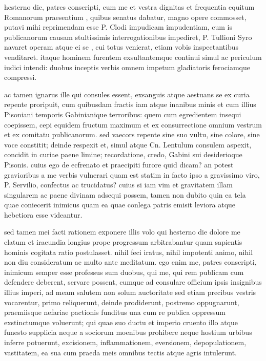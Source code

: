 
 hesterno die, patres conscripti, cum me et vestra dignitas et frequentia equitum Romanorum praesentium , quibus senatus dabatur, magno opere commosset, putavi mihi reprimendam esse P. Clodi impudicam impudentiam, cum is publicanorum causam stultissimis interrogationibus impediret, P. Tullioni Syro navaret operam atque ei se , cui totus venierat, etiam vobis inspectantibus venditaret. itaque hominem furentem exsultantemque continui simul ac periculum iudici intendi: duobus inceptis verbis omnem impetum gladiatoris ferociamque compressi.

 ac tamen ignarus ille qui consules essent, exsanguis atque aestuans se ex curia repente proripuit, cum quibusdam fractis iam atque inanibus minis et cum illius Pisoniani temporis Gabinianique terroribus: quem cum egredientem insequi coepissem, cepi equidem fructum maximum et ex consurrectione omnium vestrum et ex comitatu publicanorum. sed vaecors repente sine suo vultu, sine colore, sine voce constitit; deinde respexit et, simul atque Cn. Lentulum consulem aspexit, concidit in curiae paene limine; recordatione, credo, Gabini sui desiderioque Pisonis. cuius ego de ecfrenato et praecipiti furore quid dicam? an potest gravioribus a me verbis vulnerari quam est statim in facto ipso a gravissimo viro, P. Servilio, confectus ac trucidatus? cuius si iam vim et gravitatem illam singularem ac paene divinam adsequi possem, tamen non dubito quin ea tela quae coniecerit inimicus quam ea quae conlega patris emisit leviora atque hebetiora esse videantur.

 sed tamen mei facti rationem exponere illis volo qui hesterno die dolore me elatum et iracundia longius prope progressum arbitrabantur quam sapientis hominis cogitata ratio postulasset. nihil feci iratus, nihil impotenti animo, nihil non diu consideratum ac multo ante meditatum. ego enim me, patres conscripti, inimicum semper esse professus sum duobus, qui me, qui rem publicam cum defendere deberent, servare possent, cumque ad consulare officium ipsis insignibus illius imperi, ad meam salutem non solum auctoritate sed etiam precibus vestris vocarentur, primo reliquerunt, deinde prodiderunt, postremo oppugnarunt, praemiisque nefariae pactionis funditus una cum re publica oppressum exstinctumque voluerunt; qui quae suo ductu et imperio cruento illo atque funesto supplicia neque a sociorum moenibus prohibere neque hostium urbibus inferre potuerunt, excisionem, inflammationem, eversionem, depopulationem, vastitatem, ea sua cum praeda meis omnibus tectis atque agris intulerunt.

